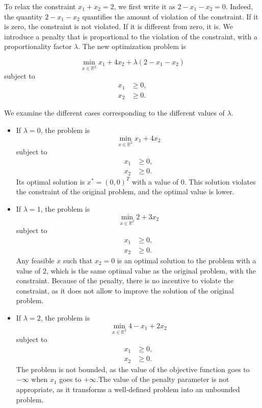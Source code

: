 
 To relax the constraint $x_1+x_2=2$, we first write it as $2-x_1-x_2
 = 0$. Indeed, the quantity $2-x_1-x_2$ quantifies the amount of
 violation of the constraint. If it is zero, the constraint is not
 violated. If it is different from zero, it is.  We introduce a penalty that is proportional to the violation of the constraint, with a proportionality factor $\lambda$. The new optimization problem is

 \[
 \min_{x \in \mathbb{R}^2} x_1+4x_2 + \lambda(2-x_1-x_2)
 \]
 subject to 
\begin{align*}
x_1 & \geq 0,\\
x_2 & \geq 0.
\end{align*}

 We examine the different cases corresponding to the different values of $\lambda$.

\begin{itemize}
\item If $\lambda=0$, the problem is
 \[
 \min_{x \in \mathbb{R}^2} x_1+4x_2
 \]
 subject to 
\begin{align*}
x_1 & \geq 0,\\
x_2 & \geq 0.
\end{align*}
Its optimal solution is  $x^*=(0,0)^T$ with a value of $0$. This
solution violates the constraint of the original problem, and the
optimal value is lower. 

\item If $\lambda=1$, the problem is
 \[
 \min_{x \in \mathbb{R}^2} 2+3x_2 
 \]
 subject to 
\begin{align*}
x_1 & \geq 0,\\
x_2 & \geq 0.
\end{align*}
Any feasible $x$ such that $x_2=0$ is an optimal solution to the
problem with a value of $2$, which is the same optimal value as the
original problem, with the constraint. Because of the penalty,
there is no incentive to violate the constraint, as it does not allow
to improve the solution of the original problem. 

\item If $\lambda=2$, the problem is
 \[
 \min_{x \in \mathbb{R}^2} 4-x_1+ 2x_2
 \]
 subject to 
\begin{align*}
x_1 & \geq 0,\\
x_2 & \geq 0.
\end{align*}
The problem is not bounded, as the value of the objective function
goes to $-\infty$ when $x_1$ goes to $+\infty$.The value of the
penalty parameter is not appropriate, as it transforms a well-defined
problem into an unbounded problem. 

\end{itemize}

